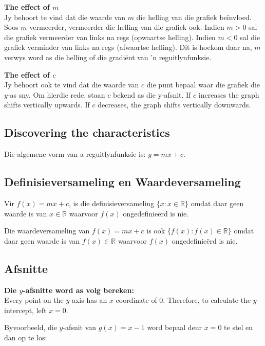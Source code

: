 \textbf{The effect of $m$}\\
Jy behoort te vind dat die waarde van $m$ die helling van die grafiek beïnvloed. Soos $m$ vermeerder, vermeerder die
helling van die grafiek ook. Indien $m>0$ sal die grafiek vermeerder van links na regs (opwaartse helling). Indien $m<0$ sal die grafiek verminder van links na regs (afwaartse helling). Dit is hoekom daar na, $m$  verwys word as die helling of die gradiënt van ’n reguitlynfunksie.\par 

\textbf{The effect of $c$}\\
Jy behoort ook te vind dat die waarde van $c$ die punt bepaal waar die grafiek die $y$-as sny. Om hierdie rede, staan $c$ bekend as die y-afsnit. If $c$ increases the graph shifts vertically upwards. If $c$ decreases, the graph shifts vertically downwards.\par 


\subsection*{Discovering the characteristics} 
Die algemene vorm van a reguitlynfunksie is:  $y=mx + c$. 
\subsection*{Definisieversameling en Waardeversameling}
\nopagebreak
Vir $f(x)=mx+c$, is die definisieversameling $\{x:x\in \mathbb{R}\}$ omdat daar geen waarde is van  $x\in \mathbb{R}$ waarvoor $f(x)$ ongedefinieërd is nie.\par 
Die waardeversameling van $f(x)=mx+c$ is ook $\{f(x):f(x)\in \mathbb{R}\}$ omdat daar geen waarde is van  $f(x)\in \mathbb{R}$ waarvoor $f(x)$ ongedefinieërd is nie.\par 
\par 

\subsection*{Afsnitte}
\textbf{Die $y$-afsnitte word as volg bereken:}\\
Every point on the $y$-axis has an $x$-coordinate of $0$. Therefore, to calculate the $y$-intercept, left $x=0$.\par
Byvoorbeeld, die $y$-afsnit van $g(x)=x-1$ word bepaal deur $x=0$ te stel en dan op te los:\par 

